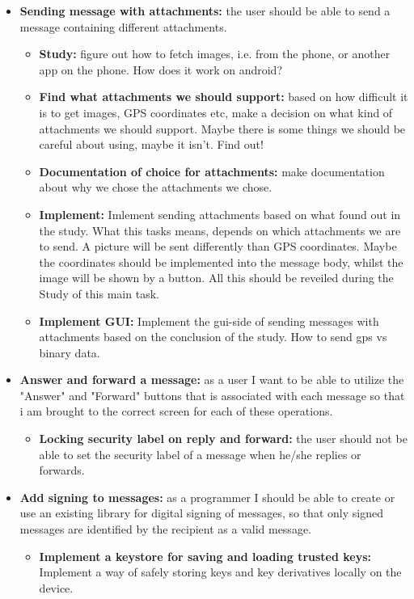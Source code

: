 \begin{itemize}
\begin{itemize}
\end{itemize}
\item{}\textbf{Sending message with attachments:} the user should be able to send a message containing different attachments.
\begin{itemize}
\item{}\textbf{Study:} figure out how to fetch images, i.e. from the phone, or another app on the phone. How does it work on android?
\item{}\textbf{Find what attachments we should support:} based on how difficult it is to get images, GPS coordinates etc, make a decision on what kind of attachments we should support. Maybe there is some things we should be careful about using, maybe it isn't. Find out!
\item{}\textbf{Documentation of choice for attachments:} make documentation about why we chose the attachments we chose.
\item{}\textbf{Implement:} Imlement sending attachments based on what found out in the study. What this tasks means, depends on which attachments we are to send. A picture will be sent differently than GPS coordinates. Maybe the coordinates should be implemented into the message body, whilst the image will be shown by a button. All this should be reveiled during the Study of this main task. 
\item{}\textbf{Implement GUI:} Implement the gui-side of sending messages with attachments based on the conclusion of the study. How to send gps vs binary data.
\end{itemize}
\item{}\textbf{Answer and forward a message:} as a user I want to be able to utilize the "Answer" and "Forward" buttons that is associated with each message so that i am brought to the correct screen for each of these operations.
\begin{itemize}
\item{}\textbf{Locking security label on reply and forward:} the user should not be able to set the security label of a message when he/she replies or forwards.
\end{itemize}
\item{}\textbf{Add signing to messages:} as a programmer I should be able to create or use an existing library for digital signing of messages, so that only signed messages are identified by the recipient as a valid message.
\begin{itemize}
\item{}\textbf{Implement a keystore for saving and loading trusted keys:} Implement a way of safely storing keys and key derivatives locally on the device. 

\end{itemize}
\end{itemize}
